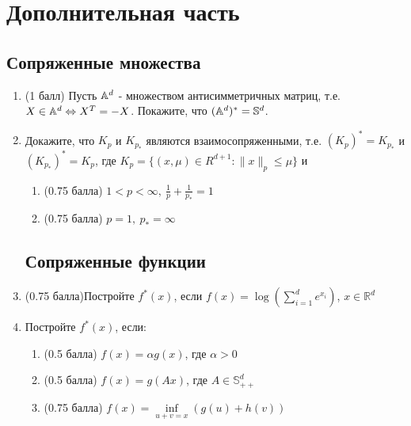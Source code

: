\documentclass[a5paper,twoside,russian,8pt]{article}
\def  \R {\mathbb R}
\newcommand{\St}{\mathbb{S}}
\begin{document}
\section*{Дополнительная часть}

\subsection*{Сопряженные множества}
\begin{enumerate}[label=\textbf{Задача \arabic*.}]
    \item (1 балл) Пусть $\Bbb{A}^d$ - множеством антисимметричных матриц, т.е. $X\in \Bbb{A}^d \Leftrightarrow X^T = -X$. Покажите, что $(\Bbb{A}^d)^*=\St^d$.
    
    \item Докажите, что $K_p$ и $K_{p_*}$ являются взаимосопряженными, т.е. $(K_p)^* = K_{p_*}$ и $(K_{p_*})^* = K_p$, где $K_p=\{(x,\mu)\in R^{d+1}:\|x\|_p\leq\mu\}$ и 
        \begin{enumerate}
            \item (0.75 балла) $1 < p < \infty,\ \frac{1}{p}+\frac{1}{p_*} = 1$
            \item (0.75 балла) $p=1,\ p_*=\infty$
        \end{enumerate}
    
    \subsection*{Сопряженные функции}
    
    \item (0.75 балла)Постройте $f^*(x)$, если $f(x) = \log \left(\sum_{i=1}^d e^{x_i} \right) $, $x\in \R^d$
    
    \item Постройте $f^*(x)$, если:
        \begin{enumerate}
            \item (0.5 балла) $f(x) = \alpha g(x)$, где $\alpha > 0$
            \item (0.5 балла) $f(x) = g(Ax)$, где $A\in \St^d_{++}$
            \item (0.75 балла) $f(x) = \inf\limits_{u+v=x}(g(u)+h(v))$
        \end{enumerate}

\end{enumerate}
\end{document}
